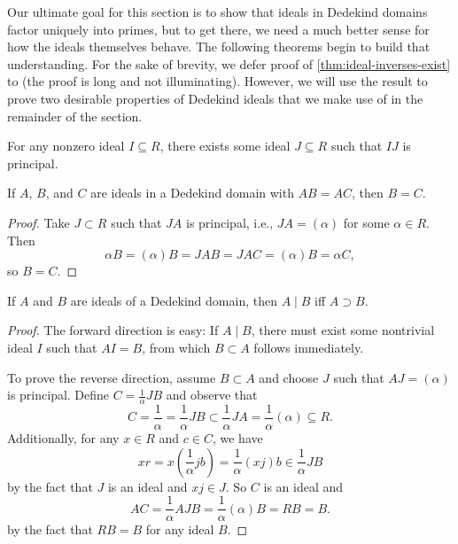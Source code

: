 Our ultimate goal for this section is to show that ideals in Dedekind domains factor uniquely into primes, but to get there, we need a much better sense for how the ideals themselves behave.
The following theorems begin to build that understanding. For the sake of brevity, we defer proof of \autoref{thm:ideal-inverses-exist} to \textcite[40]{marcus} (the proof is long and not illuminating). However, we will use the result to prove two desirable properties of Dedekind ideals that we make use of in the remainder of the section.

\begin{theorem}
    \label{thm:ideal-inverses-exist}
    For any nonzero ideal $I \subseteq R$, there exists some ideal $J \subseteq R$ such that $IJ$ is principal.
\end{theorem}

\begin{corollary}
    \label{thm:ideal-cancellation-law}
    If $A$, $B$, and $C$ are ideals in a Dedekind domain with $AB = AC$, then $B = C$.
\end{corollary}

\begin{proof}
    Take $J \subset R$ such that $JA$ is principal, i.e., $JA = (\alpha)$ for some $\alpha \in R$. Then
    \begin{equation}
        \alpha B
        = (\alpha) B
        = JAB
        = JAC
        = (\alpha) B
        = \alpha C,
    \end{equation}
    so $B = C$.
\end{proof}

\begin{corollary}
    \label{thm:ideal-divisibility}
    If $A$ and $B$ are ideals of a Dedekind domain, then $A \mid B$ iff $A \supset B$.
\end{corollary}

\begin{proof}
    The forward direction is easy: If $A \mid B$, there must exist some nontrivial ideal $I$ such that $AI = B$, from which $B \subset A$ follows immediately.

    To prove the reverse direction, assume $B \subset A$ and choose $J$ such that $AJ = (\alpha)$ is principal. Define $C = \frac 1 \alpha JB$ and observe that
    \begin{equation}
        C
        = \frac 1 \alpha
        = \frac 1 \alpha J B
        \subset \frac 1 \alpha J A
        = \frac 1 \alpha (\alpha)
        \subseteq R.
    \end{equation}
    Additionally, for any $x \in R$ and $c \in C$, we have
    \begin{equation}
        xr
        = x (\frac 1 \alpha j b)
        = \frac 1 \alpha (x j) b
        \in \frac 1 \alpha J B
    \end{equation}
    by the fact that $J$ is an ideal and $xj \in J$. So $C$ is an ideal and
    \begin{equation}
        AC
        = \frac 1 \alpha A J B
        = \frac 1 \alpha (\alpha) B
        = R B
        = B.
    \end{equation}
    by the fact that $RB = B$ for any ideal $B$.
\end{proof}

